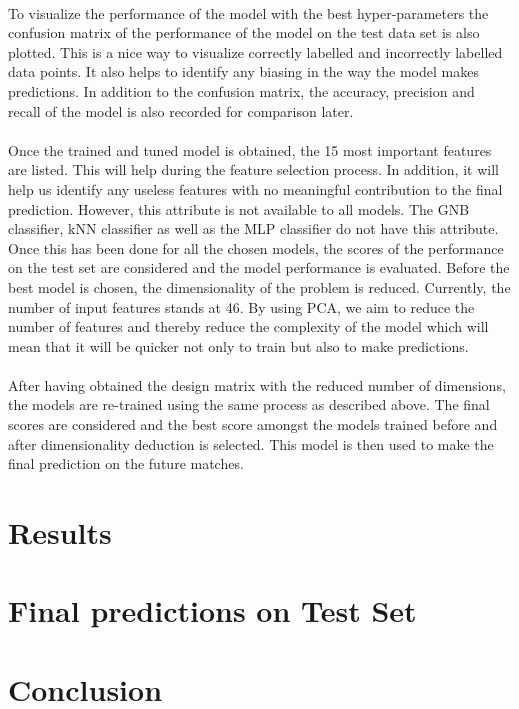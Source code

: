 \documentclass[a4paper,12pt]{article}
\begin{document}
	\\
	To visualize the performance of the model with the best hyper-parameters the confusion matrix of the performance of the model on the test data set is also plotted. This is a nice way to visualize correctly labelled and incorrectly labelled data points. It also helps to identify any biasing in the way the model makes predictions. In addition to the confusion matrix, the accuracy, precision and recall of the model is also recorded for comparison later.\\
	\\
	Once the trained and tuned model is obtained, the 15 most important features are listed. This will help during the feature selection process. In addition, it will help us identify any useless features with no meaningful contribution to the final prediction. However, this attribute is not available to all models. The GNB classifier, kNN classifier as well as the MLP classifier do not have this attribute.
	Once this has been done for all the chosen models, the scores of the performance on the test set are considered and the model performance is evaluated. Before the best model is chosen, the dimensionality of the problem is reduced. Currently, the number of input features stands at 46. By using PCA, we aim to reduce the number of features and thereby reduce the complexity of the model which will mean that it will be quicker not only to train but also to make predictions.\\
	\\
	After having obtained the design matrix with the reduced number of dimensions, the models are re-trained using the same process as described above. The final scores are considered and the best score amongst the models trained before and after dimensionality deduction is selected. This model is then used to make the final prediction on the future matches. 
	
	
	\section{Results}
	
	\section{Final predictions on Test Set}
	
	\section{Conclusion}
	
\end{document}
